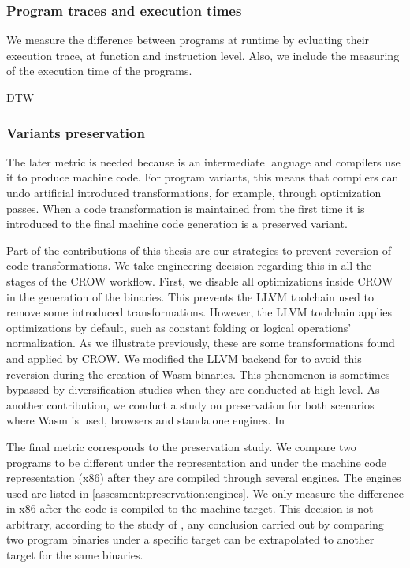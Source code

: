 \subsubsection{Program traces and execution times}

We measure the difference between programs at runtime by evluating their execution trace, at function and instruction level. Also, we include the measuring of the execution time of the programs.

\begin{metric}{DTW}

\end{metric}

\subsubsection{Variants preservation}

The later metric is needed because \wasm is an intermediate language and compilers use it to produce machine code. For program variants, this means that compilers can undo artificial introduced transformations, for example, through optimization passes. When a code transformation is maintained from the first time it is introduced to the final machine code generation is  a preserved variant. 

Part of the contributions of this thesis are our strategies to prevent reversion of code transformations. We take engineering decision regarding this in all the stages of the CROW workflow. First, we disable all optimizations inside CROW in the generation of the \wasm binaries. This prevents the LLVM toolchain used to remove some introduced transformations. However, the LLVM toolchain applies optimizations by default, such as constant folding or logical operations' normalization. As we illustrate previously, these are some transformations found and applied by CROW. We modified the LLVM backend for \wasm to avoid this reversion during the creation of Wasm binaries.
This phenomenon is sometimes bypassed by diversification studies when they are conducted at high-level. As another contribution, we conduct a study on preservation for both scenarios where Wasm is used, browsers and standalone engines. In

The final metric corresponds to the preservation study. We compare two programs to be different under the \wasm representation and under the machine code representation (x86) after they are compiled through several engines. The engines used are listed in \autoref{assesment:preservation:engines}. We only measure the difference in x86 after the \wasm code is compiled to the machine target. This decision is not arbitrary, according to the study of \cite{Paper on binary diff survey}, any conclusion carried out by comparing two program binaries under a specific target can be extrapolated to another target for the same binaries.


